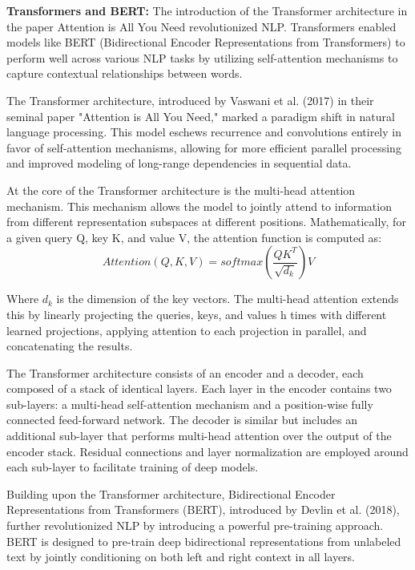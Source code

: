 \textbf{Transformers and BERT:} The introduction of the Transformer architecture in the paper Attention is All You Need revolutionized NLP. Transformers enabled models like BERT (Bidirectional Encoder Representations from Transformers) to perform well across various NLP tasks by utilizing self-attention mechanisms to capture contextual relationships between words.

The Transformer architecture, introduced by Vaswani et al. (2017) in their seminal paper "Attention is All You Need," marked a paradigm shift in natural language processing. This model eschews recurrence and convolutions entirely in favor of self-attention mechanisms, allowing for more efficient parallel processing and improved modeling of long-range dependencies in sequential data.

At the core of the Transformer architecture is the multi-head attention mechanism. This mechanism allows the model to jointly attend to information from different representation subspaces at different positions. Mathematically, for a given query Q, key K, and value V, the attention function is computed as:
\begin{equation}
    Attention(Q, K, V) = softmax(\frac{QK^T}{\sqrt{d_k}})V
\end{equation}


Where $d_k$ is the dimension of the key vectors. The multi-head attention extends this by linearly projecting the queries, keys, and values h times with different learned projections, applying attention to each projection in parallel, and concatenating the results.

The Transformer architecture consists of an encoder and a decoder, each composed of a stack of identical layers. Each layer in the encoder contains two sub-layers: a multi-head self-attention mechanism and a position-wise fully connected feed-forward network. The decoder is similar but includes an additional sub-layer that performs multi-head attention over the output of the encoder stack. Residual connections and layer normalization are employed around each sub-layer to facilitate training of deep models.

Building upon the Transformer architecture, Bidirectional Encoder Representations from Transformers (BERT), introduced by Devlin et al. (2018), further revolutionized NLP by introducing a powerful pre-training approach. BERT is designed to pre-train deep bidirectional representations from unlabeled text by jointly conditioning on both left and right context in all layers.

